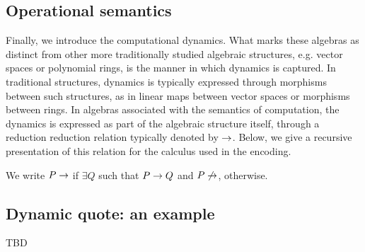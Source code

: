 \subsection{Operational semantics}

Finally, we introduce the computational dynamics. What marks these
algebras as distinct from other more traditionally studied algebraic
structures, e.g. vector spaces or polynomial rings, is the manner in
which dynamics is captured. In traditional structures, dynamics is typically
expressed through morphisms between such structures, as in linear maps
between vector spaces or morphisms between rings. In algebras
associated with the semantics of computation, the dynamics is
expressed as part of the algebraic structure itself, through a
reduction reduction relation typically denoted by $\rightarrow$. Below, we
give a recursive presentation of this relation for the calculus used
in the encoding.


We write $P\rightarrow$ if $\exists Q $ such that $ P \rightarrow Q$ and $P\not\rightarrow$, otherwise.

\subsection{ Dynamic quote: an example }
TBD



